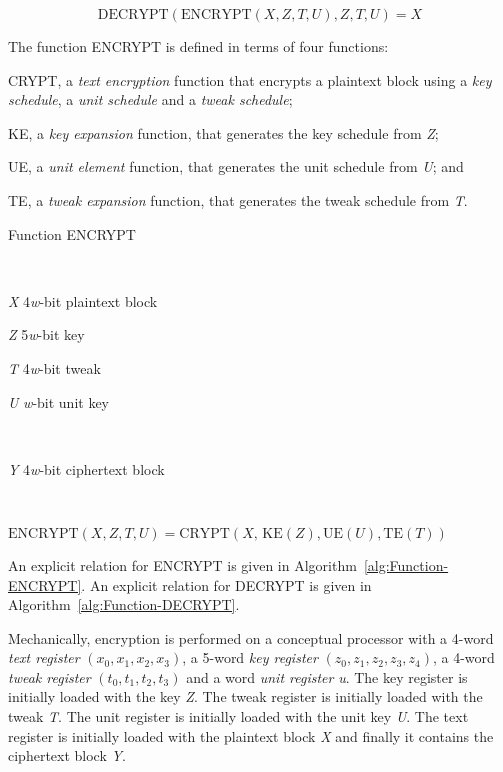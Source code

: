 \documentclass[a4paper,oneside,english]{amsart}
\numberwithin{equation}{section}
\numberwithin{figure}{section}
\newenvironment{lyxlist}[1]
{\begin{list}{}
{\settowidth{\labelwidth}{#1}
 \setlength{\leftmargin}{\labelwidth}
 \addtolength{\leftmargin}{\labelsep}
 \renewcommand{\makelabel}[1]{##1\hfil}}}
{\end{list}}
\begin{document}
\[
\mathrm{DECRYPT}(\mathrm{ENCRYPT}(X,Z,T,U),Z,T,U)=X
\]


The function ENCRYPT is defined in terms of four functions:
\begin{lyxlist}{00.00.0000}
\item [{CRYPT,}] a \emph{text encryption} function that encrypts a plaintext
block using a \emph{key schedule}, a \emph{unit schedule} and a \emph{tweak
schedule}; 
\item [{KE,}] a \emph{key expansion} function, that generates the key schedule
from \emph{Z};
\item [{UE,}] a \emph{unit element} function, that generates the unit schedule
from \emph{U}; and
\item [{TE,}] a \emph{tweak expansion} function, that generates the tweak
schedule from \emph{T}.
\end{lyxlist}
\begin{algorithm}[h]
\caption{\label{alg:Function-ENCRYPT}Function ENCRYPT}

\begin{description}
\item [{Input}]~

\begin{lyxlist}{00.00.0000}
\item [{\emph{X}}] 4\emph{w}-bit plaintext block
\item [{\emph{Z}}] 5\emph{w}-bit key
\item [{\emph{T}}] 4\emph{w}-bit tweak
\item [{\emph{U}}] \emph{w}-bit unit key
\end{lyxlist}
\item [{Output}]~

\begin{lyxlist}{00.00.0000}
\item [{\emph{Y}}] 4\emph{w}-bit ciphertext block
\end{lyxlist}
\item [{Relation}]~


$\mathrm{ENCRYPT}(X,Z,T,U)=\mathrm{CRYPT}(X,\mathrm{\, KE}(Z),\mathrm{UE}(U),\mathrm{TE}(T))$\end{description}
\end{algorithm}


An explicit relation for ENCRYPT is given in Algorithm~\ref{alg:Function-ENCRYPT}.
An explicit relation for DECRYPT is given in Algorithm~\ref{alg:Function-DECRYPT}.

Mechanically, encryption is performed on a conceptual processor with
a 4-word \emph{text register} $(x_{0},x_{1},x_{2},x_{3})$, a 5-word
\emph{key register} $(z_{0},z_{1},z_{2},z_{3},z_{4})$, a 4-word \emph{tweak
register} $(t_{0},t_{1},t_{2},t_{3})$ and a word \emph{unit register}
\emph{u}. The key register is initially loaded with the key \emph{Z}.
The tweak register is initially loaded with the tweak \emph{T}. The
unit register is initially loaded with the unit key \emph{U}. The
text register is initially loaded with the plaintext block \emph{X}
and finally it contains the ciphertext block \emph{Y}. 
\end{document}
